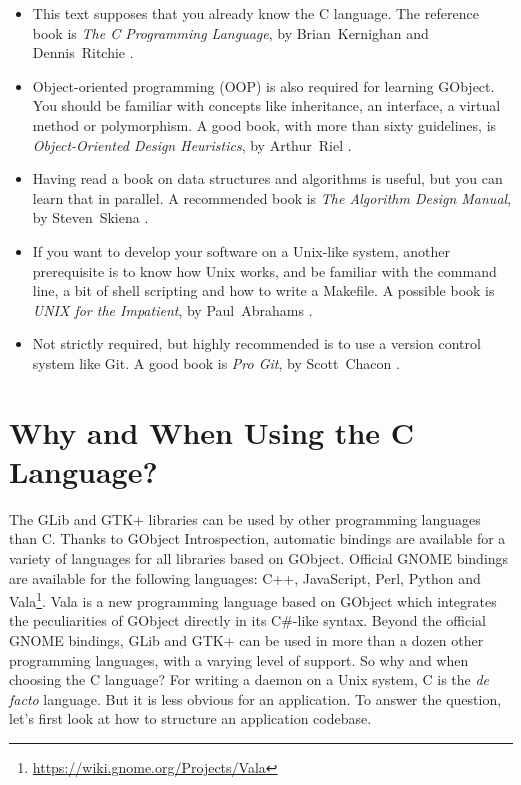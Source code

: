 \begin{itemize}
  \item This text supposes that you already know the C language. The reference book is \emph{The C Programming Language}, by Brian~Kernighan and Dennis~Ritchie \cite{k-r-book}.

  \item Object-oriented programming (OOP) is also required for learning GObject. You should be familiar with concepts like inheritance, an interface, a virtual method or polymorphism. A good book, with more than sixty guidelines, is \emph{Object-Oriented Design Heuristics}, by Arthur~Riel \cite{oop-book}.

  \item Having read a book on data structures and algorithms is useful, but you can learn that in parallel. A recommended book is \emph{The Algorithm Design Manual}, by Steven~Skiena \cite{algo-book}.

  \item If you want to develop your software on a Unix-like system, another prerequisite is to know how Unix works, and be familiar with the command line, a bit of shell scripting and how to write a Makefile. A possible book is \emph{UNIX for the Impatient}, by Paul~Abrahams \cite{unix-impatient}.

  \item Not strictly required, but highly recommended is to use a version control system like Git. A good book is \emph{Pro Git}, by Scott~Chacon \cite{pro-git}.
\end{itemize}

\section{Why and When Using the C Language?}

The GLib and GTK+ libraries can be used by other programming languages than C. Thanks to GObject Introspection, automatic bindings are available for a variety of languages for all libraries based on GObject. Official GNOME bindings are available for the following languages: C++, JavaScript, Perl, Python and Vala\footnote{\url{https://wiki.gnome.org/Projects/Vala}}. Vala is a new programming language based on GObject which integrates the peculiarities of GObject directly in its C\#-like syntax. Beyond the official GNOME bindings, GLib and GTK+ can be used in more than a dozen other programming languages, with a varying level of support. So why and when choosing the C language? For writing a daemon on a Unix system, C is the \emph{de facto} language. But it is less obvious for an application. To answer the question, let's first look at how to structure an application codebase.

